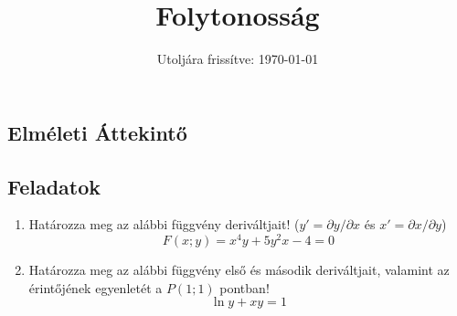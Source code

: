 \documentclass[a4paper, 12pt]{scrartcl}
\title{Folytonosság}
\date{Utoljára frissítve: \today}
\begin{document}
\maketitle

\subsection{Elméleti Áttekintő}

\clearpage
\subsection{Feladatok}

\begin{enumerate}
  \item Határozza meg az alábbi függvény deriváltjait!
        ($y' = \partial y / \partial x$ és $x' = \partial x / \partial y$)
        \[
          F(x; y) = x^4 y + 5 y^2 x- 4 = 0
        \]

  \item Határozza meg az alábbi függvény első és második deriváltjait, valamint
        az érintőjének egyenletét a $P(1;1)$ pontban!
        \[
          \ln y + xy = 1
        \]
\end{enumerate}

\end{document}
